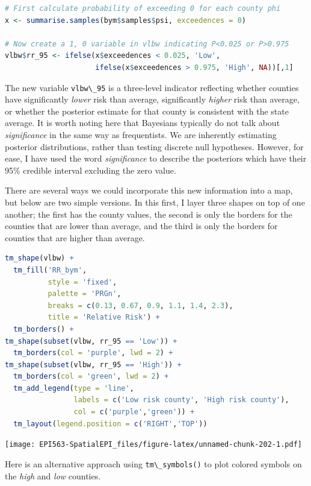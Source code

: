 \documentclass[
]{book}
\newcommand{\passthrough}[1]{#1}
\begin{document}
\begin{lstlisting}[language=R]
# First calculate probability of exceeding 0 for each county phi
x <- summarise.samples(bym$samples$psi, exceedences = 0)

# Now create a 1, 0 variable in vlbw indicating P<0.025 or P>0.975
vlbw$rr_95 <- ifelse(x$exceedences < 0.025, 'Low', 
                     ifelse(x$exceedences > 0.975, 'High', NA))[,1]
\end{lstlisting}

The new variable \passthrough{\lstinline!vlbw\_95!} is a three-level indicator reflecting whether counties have significantly \emph{lower} risk than average, significantly \emph{higher} risk than average, or whether the posterior estimate for that county is consistent with the state average. It is worth noting here that Bayesians typically do not talk about \emph{significance} in the same way as frequentists. We are inherently estimating posterior distributions, rather than testing discrete null hypotheses. However, for ease, I have used the word \emph{significance} to describe the posteriors which have their 95\% credible interval excluding the zero value.

There are several ways we could incorporate this new information into a map, but below are two simple versions. In this first, I layer three shapes on top of one another; the first has the county values, the second is only the borders for the counties that are lower than average, and the third is only the borders for counties that are higher than average.

\begin{lstlisting}[language=R]
tm_shape(vlbw) +
  tm_fill('RR_bym',
          style = 'fixed',
          palette = 'PRGn',
          breaks = c(0.13, 0.67, 0.9, 1.1, 1.4, 2.3),
          title = 'Relative Risk') +
  tm_borders() + 
tm_shape(subset(vlbw, rr_95 == 'Low')) + 
  tm_borders(col = 'purple', lwd = 2) +
tm_shape(subset(vlbw, rr_95 == 'High')) + 
  tm_borders(col = 'green', lwd = 2) +
  tm_add_legend(type = 'line', 
                labels = c('Low risk county', 'High risk county'), 
                col = c('purple','green')) +
  tm_layout(legend.position = c('RIGHT','TOP'))
\end{lstlisting}

\texttt{[image: EPI563-SpatialEPI\_files/figure-latex/unnamed-chunk-202-1.pdf]}

Here is an alternative approach using \passthrough{\lstinline!tm\_symbols()!} to plot colored symbols on the \emph{high} and \emph{low} counties.
\end{document}
